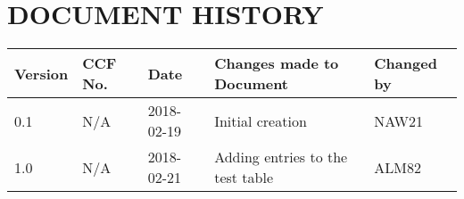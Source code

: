 \documentclass{project}
\begin{document}
\section*{DOCUMENT HISTORY}
\begin{tabular}{|l | l | l | l | l |}
\hline
Version & CCF No. & Date & Changes made to Document & Changed by \\
\hline
0.1 & N/A & 2018-02-19 & Initial creation & NAW21 \\
\hline
1.0 & N/A & 2018-02-21 & Adding entries to the test table & ALM82 \\
\hline
\end{tabular}
\label{thelastpage}
\end{document}
